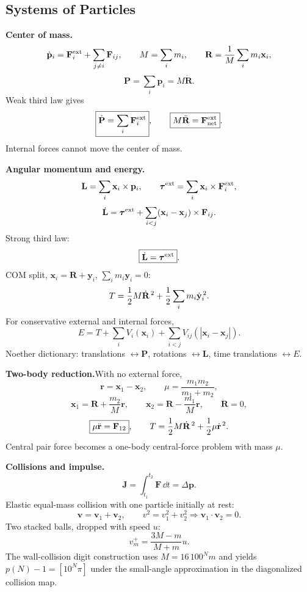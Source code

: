 \subsection{Systems of Particles}

\noindent\textbf{Center of mass.}\quad
\[
  \dot{\mathbf p}_i=\mathbf F_i^{\rm ext}+\sum_{j\ne i}\mathbf F_{ij},\qquad
  M=\sum_i m_i,\qquad
  \mathbf R=\frac{1}{M}\sum_i m_i\mathbf x_i,
\]
\[
  \mathbf P=\sum_i\mathbf p_i=M\dot{\mathbf R}.
\]
Weak third law gives
\[
  \boxed{\dot{\mathbf P}=\sum_i\mathbf F_i^{\rm ext}},\qquad
  \boxed{M\ddot{\mathbf R}=\mathbf F_{\rm net}^{\rm ext}}.
\]
Internal forces cannot move the center of mass. 

\noindent\textbf{Angular momentum and energy.}\quad
\[
  \mathbf L=\sum_i\mathbf x_i\times\mathbf p_i,\qquad
  \bm\tau^{\rm ext}=\sum_i\mathbf x_i\times\mathbf F_i^{\rm ext},
\]
\[
  \dot{\mathbf L}=\bm\tau^{\rm ext}
  +\sum_{i<j}(\mathbf x_i-\mathbf x_j)\times\mathbf F_{ij}.
\]
Strong third law:
\[
  \boxed{\dot{\mathbf L}=\bm\tau^{\rm ext}}.
\]
COM split, $\mathbf x_i=\mathbf R+\mathbf y_i$, $\sum_i m_i\mathbf y_i=0$:
\[
  T=\frac{1}{2} M\dot{\mathbf R}^{\,2}+\frac{1}{2}\sum_i m_i\dot{\mathbf y}_i^{\,2}.
\]
For conservative external and internal forces,
\[
  \boxed{E=T+\sum_iV_i(\mathbf x_i)+\sum_{i<j}V_{ij}(|\mathbf x_i-\mathbf x_j|)}.
\]
Noether dictionary: translations $\leftrightarrow\mathbf P$, rotations
$\leftrightarrow\mathbf L$, time translations $\leftrightarrow E$.

\noindent\textbf{Two-body reduction.}\quad With no external force,
\[
  \mathbf r=\mathbf x_1-\mathbf x_2,\qquad
  \mu=\frac{m_1m_2}{m_1+m_2},
\]
\[
  \mathbf x_1=\mathbf R+\frac{m_2}{M}\mathbf r,\qquad
  \mathbf x_2=\mathbf R-\frac{m_1}{M}\mathbf r,\qquad
  \ddot{\mathbf R}=0,
\]
\[
  \boxed{\mu\ddot{\mathbf r}=\mathbf F_{12}},\qquad
  T=\frac{1}{2} M\dot{\mathbf R}^{\,2}+\frac{1}{2}\mu\dot{\mathbf r}^{\,2}.
\]
Central pair force becomes a one-body central-force problem with mass $\mu$.

\noindent\textbf{Collisions and impulse.}\quad
\[
  \mathbf J=\int_{t_1}^{t_2}\mathbf F\,\dd t=\Delta\mathbf p.
\]
Elastic equal-mass collision with one particle initially at rest:
\[
  \mathbf v=\mathbf v_1+\mathbf v_2,\qquad
  v^2=v_1^2+v_2^2
  \Longrightarrow
  \boxed{\mathbf v_1\cdot\mathbf v_2=0}.
\]
Two stacked balls, dropped with speed $u$:
\[
  \boxed{v_m^+=\frac{3M-m}{M+m}u}.
\]
The wall-collision digit construction uses $M=16\,100^N m$ and yields
$p(N)-1=[10^N\pi]$ under the small-angle approximation in the diagonalized
collision map. 

